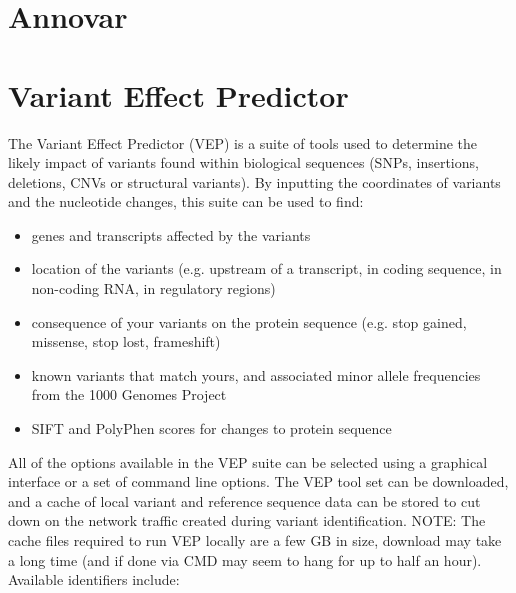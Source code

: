 \documentclass[12pt]{report}
\begin{document}
\section*{Annovar}


\section*{Variant Effect Predictor}

The Variant Effect Predictor (VEP) is a suite of tools used to determine the likely impact of variants found within biological sequences (SNPs, insertions, deletions, CNVs or structural variants). By inputting the coordinates of variants and the nucleotide changes, this suite can be used to find:

\begin{itemize}
	\item genes and transcripts affected by the variants
	
	\item location of the variants (e.g. upstream of a transcript, in coding sequence, in non-coding RNA, in regulatory regions)
	
	\item consequence of your variants on the protein sequence (e.g. stop gained, missense, stop lost, frameshift)
	
	\item known variants that match yours, and associated minor allele frequencies from the 1000 Genomes Project
	
	\item SIFT and PolyPhen scores for changes to protein sequence
\end{itemize}

All of the options available in the VEP suite can be selected using a graphical interface or a set of command line options. The VEP tool set can be downloaded, and a cache of local variant and reference sequence data can be stored to cut down on the network traffic created during variant identification. NOTE: The cache files required to run VEP locally are a few GB in size, download may take a long time (and if done via CMD may seem to hang for up to half an hour). Available identifiers include:
\end{document}

